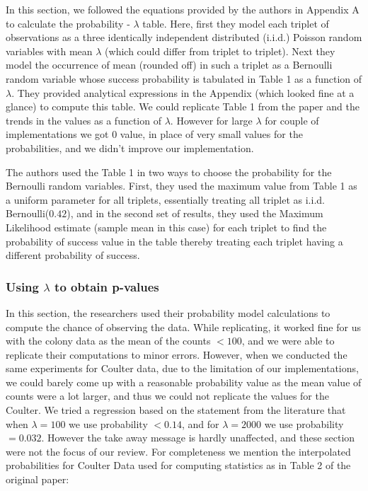 \documentclass{article}
\begin{document}
In this section, we followed the equations provided by the authors in
Appendix A to calculate the probability - $\lambda$ table. Here, first they model each triplet of observations as a three identically independent distributed (i.i.d.) Poisson random variables with mean $\lambda$ (which could differ from triplet to triplet). Next they model the occurrence of mean (rounded off) in such a triplet as a Bernoulli random variable whose success probability is tabulated in Table 1 as a function of $\lambda$. They provided analytical expressions in the Appendix (which looked fine at a glance) to compute this table. We could
replicate Table 1 from the paper and the trends in the values as a function of $\lambda$. However for large $\lambda$ for couple of implementations we got $0$ value, in place of very small values for the probabilities, and we didn't improve our implementation.

The authors used the Table 1 in two ways to choose the probability for the Bernoulli random variables. First, they used the maximum value from Table 1 as a uniform parameter for all triplets, essentially treating all triplet as i.i.d. Bernoulli($0.42$), and in the second set of results, they used the Maximum Likelihood estimate (sample mean in this case) for each triplet to find the probability of success value in the table thereby treating each triplet having a different probability of success.

    \subsubsection{Using $\lambda$ to obtain
p-values}\label{using-lambda-to-obtain-p-values}

In this section, the researchers used their probability model calculations to compute the chance of observing the data. While replicating,
it worked fine for us with the colony data as the mean of the counts $<100$, and we were able to replicate their computations to minor errors. However, when we conducted the same experiments for Coulter data, due to the limitation of our implementations, we could barely come up with a reasonable probability value as the mean value of counts were a lot larger, and thus we could not replicate the values for the Coulter. We tried a regression based on the statement from the
literature that when $\lambda = 100$ we use probability $<0.14$, and for $\lambda = 2000$ we use probability $= 0.032$. However the take away message is hardly unaffected, and these section were not the focus of our review. For completeness we mention the interpolated probabilities for Coulter Data used for computing statistics as in Table 2 of the original paper:
\end{document}
